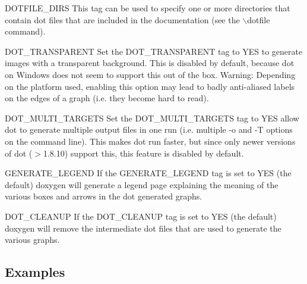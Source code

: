 \begin{DoxyDescription}
\label{config_cfg_dotfile_dirs}
\hypertarget{config_cfg_dotfile_dirs}{}
 
\item[{\ttfamily DOTFILE\_\-DIRS} ] This tag can be used to specify one or more directories that contain dot files that are included in the documentation (see the $\backslash$dotfile command).

\label{config_cfg_dot_transparent}
\hypertarget{config_cfg_dot_transparent}{}
 
\item[{\ttfamily DOT\_\-TRANSPARENT} ] Set the {\ttfamily DOT\_\-TRANSPARENT} tag to {\ttfamily YES} to generate images with a transparent background. This is disabled by default, because dot on Windows does not seem to support this out of the box. Warning: Depending on the platform used, enabling this option may lead to badly anti-\/aliased labels on the edges of a graph (i.e. they become hard to read).

\label{config_cfg_dot_multi_targets}
\hypertarget{config_cfg_dot_multi_targets}{}
 
\item[{\ttfamily DOT\_\-MULTI\_\-TARGETS} ] Set the {\ttfamily DOT\_\-MULTI\_\-TARGETS} tag to {\ttfamily YES} allow dot to generate multiple output files in one run (i.e. multiple -\/o and -\/T options on the command line). This makes dot run faster, but since only newer versions of dot ($>$1.8.10) support this, this feature is disabled by default.

\label{config_cfg_generate_legend}
\hypertarget{config_cfg_generate_legend}{}
 
\item[{\ttfamily GENERATE\_\-LEGEND} ] If the {\ttfamily GENERATE\_\-LEGEND} tag is set to {\ttfamily YES} (the default) doxygen will generate a legend page explaining the meaning of the various boxes and arrows in the dot generated graphs.

\label{config_cfg_dot_cleanup}
\hypertarget{config_cfg_dot_cleanup}{}
 
\item[{\ttfamily DOT\_\-CLEANUP} ] If the {\ttfamily DOT\_\-CLEANUP} tag is set to {\ttfamily YES} (the default) doxygen will remove the intermediate dot files that are used to generate the various graphs.


\end{DoxyDescription}\subsection*{Examples}

